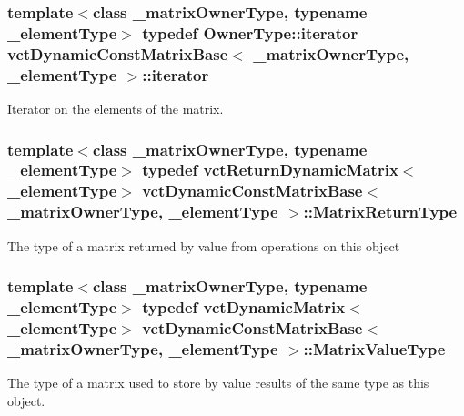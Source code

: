 \subsubsection[{iterator}]{\setlength{\rightskip}{0pt plus 5cm}template$<$class \+\_\+matrix\+Owner\+Type, typename \+\_\+element\+Type$>$ typedef Owner\+Type\+::iterator {\bf vct\+Dynamic\+Const\+Matrix\+Base}$<$ \+\_\+matrix\+Owner\+Type, \+\_\+element\+Type $>$\+::{\bf iterator}}\label{classvct_dynamic_const_matrix_base_aee4b4524b7972fd1b324cba62505a949}
Iterator on the elements of the matrix. \hypertarget{classvct_dynamic_const_matrix_base_aed2ac5b2cf673fab97a67418f8e69646}{}
\subsubsection[{Matrix\+Return\+Type}]{\setlength{\rightskip}{0pt plus 5cm}template$<$class \+\_\+matrix\+Owner\+Type, typename \+\_\+element\+Type$>$ typedef {\bf vct\+Return\+Dynamic\+Matrix}$<$\+\_\+element\+Type$>$ {\bf vct\+Dynamic\+Const\+Matrix\+Base}$<$ \+\_\+matrix\+Owner\+Type, \+\_\+element\+Type $>$\+::{\bf Matrix\+Return\+Type}}\label{classvct_dynamic_const_matrix_base_aed2ac5b2cf673fab97a67418f8e69646}
The type of a matrix returned by value from operations on this object \hypertarget{classvct_dynamic_const_matrix_base_ad7a2deb73c9de7bbea753cee80fb2ada}{}
\subsubsection[{Matrix\+Value\+Type}]{\setlength{\rightskip}{0pt plus 5cm}template$<$class \+\_\+matrix\+Owner\+Type, typename \+\_\+element\+Type$>$ typedef {\bf vct\+Dynamic\+Matrix}$<$\+\_\+element\+Type$>$ {\bf vct\+Dynamic\+Const\+Matrix\+Base}$<$ \+\_\+matrix\+Owner\+Type, \+\_\+element\+Type $>$\+::{\bf Matrix\+Value\+Type}}\label{classvct_dynamic_const_matrix_base_ad7a2deb73c9de7bbea753cee80fb2ada}
The type of a matrix used to store by value results of the same type as this object. \hypertarget{classvct_dynamic_const_matrix_base_a2e37ebc2ac741d4346d21f986e625e96}{}
